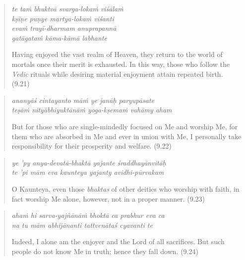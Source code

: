 \documentclass[12pt, twoside, openright]{memoir}
\begin{document}
\par
\begin{verse}
\textit{te taṁ bhuktvā svarga-lokaṁ viśālaṁ} \\
\textit{kṣīṇe puṇye martya-lokaṁ viśanti} \\
\textit{evaṁ trayī-dharmam anuprapannā} \\
\textit{gatāgataṁ kāma-kāmā labhante}

\noindent Having enjoyed the vast realm of Heaven, they return to the world of mortals once their merit is exhausted. In this way, those who follow the \textit{Vedic} rituals while desiring material enjoyment attain repeated birth. (9.21)
\end{verse}
\par



\par
\begin{verse}
\textit{ananyāś cintayanto māṁ ye janāḥ paryupāsate} \\
\textit{teṣāṁ nityābhiyuktānāṁ yoga-kṣemaṁ vahāmy aham}

\noindent But for those who are single-mindedly focused on Me and worship Me, for them who are absorbed in Me and ever in union with Me, I personally take responsibility for their prosperity and welfare. (9.22)
\end{verse}
\par



\par
\begin{verse}
\textit{ye ’py anya-devatā-bhaktā yajante śraddhayānvitāḥ} \\
\textit{te ’pi mām eva kaunteya yajanty avidhi-pūrvakam}

\noindent O Kaunteya, even those \textit{bhaktas} of other deities who worship with faith, in fact worship Me alone, however, not in a proper manner. (9.23)
\end{verse}
\par



\par
\begin{verse}
\textit{ahaṁ hi sarva-yajñānāṁ bhoktā ca prabhur eva ca} \\
\textit{na tu mām abhijānanti tattvenātaś cyavanti te}

\noindent Indeed, I alone am the enjoyer and the Lord of all sacrifices. But such people do not know Me in truth; hence they fall down. (9.24)
\end{verse}
\par
\end{document}
